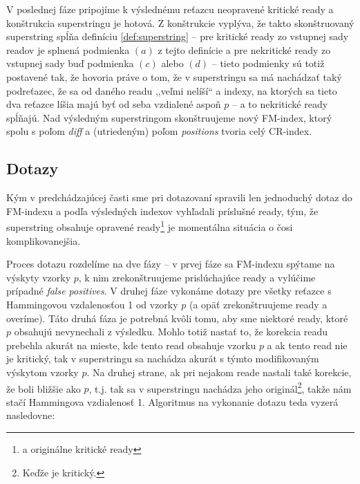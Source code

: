 V poslednej fáze pripojíme k výslednému reťazcu neopravené kritické ready a konštrukcia superstringu je hotová. Z konštrukcie vyplýva, že takto skonštruovaný superstring spĺňa definíciu \ref{def:superstring} -- pre kritické ready zo vstupnej sady readov je splnená podmienka $(a)$ z tejto definície a pre nekritické ready zo vstupnej sady buď podmienka $(c)$ alebo $(d)$ -- tieto podmienky sú totiž postavené tak, že hovoria práve o tom, že v superstringu sa má nachádzať taký podreťazec, že sa od daného readu ,,veľmi nelíší`` a indexy, na ktorých sa tieto dva reťazce líšia majú byť od seba vzdialené aspoň $p$ -- a to nekritické ready spĺňajú. Nad výsledným superstringom skonštruujeme nový FM-index, ktorý spolu s poľom \emph{diff} a (utriedeným) poľom \emph{positions} tvoria celý CR-index.


\subsection{Dotazy}
Kým v predchádzajúcej časti sme pri dotazovaní spravili len jednoduchý dotaz do FM-indexu a podľa výsledných indexov vyhľadali príslušné ready, tým, že superstring obsahuje opravené ready\footnote{a originálne kritické ready} je momentálna situácia o čosi komplikovanejšia.

Proces dotazu rozdelíme na dve fázy -- v prvej fáze sa FM-indexu spýtame na výskyty vzorky $p$, k nim zrekonštruujeme prislúchajúce ready a vylúčime prípadné \emph{false positives}. V druhej fáze vykonáme dotazy pre všetky reťazce s Hammingovou vzdalenosťou 1 od vzorky $p$ (a opäť zrekonštruujeme ready a overíme). Táto druhá fáza je potrebná kvôli tomu, aby sme niektoré ready, ktoré $p$ obsahujú nevynechali z výsledku. Mohlo totiž nastať to, že korekcia readu prebehla akurát na mieste, kde tento read obsahuje vzorku $p$ a ak tento read nie je kritický, tak v superstringu sa nachádza akurát s týmto modifikovaným výskytom vzorky $p$. Na druhej strane, ak pri nejakom reade nastali také korekcie, že boli bližšie ako $p$, t.j. tak sa v superstringu nachádza jeho originál\footnote{Keďže je kritický.}, takže nám stačí Hammingova vzdialenosť 1. Algoritmus na vykonanie dotazu teda vyzerá nasledovne:

